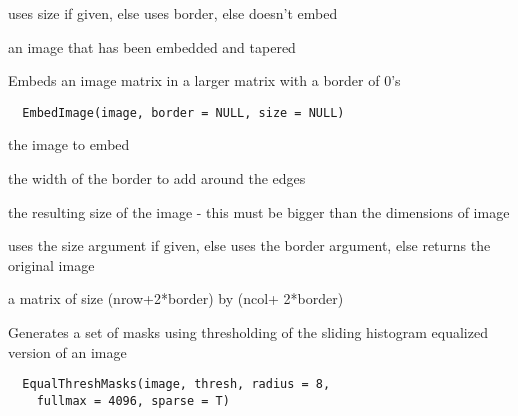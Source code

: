 \documentclass[a4paper]{book}
\begin{document}
%
\begin{Details}\relax
uses size if given, else uses border, else doesn't embed
\end{Details}
%
\begin{Value}
an image that has been embedded and tapered
\end{Value}
%
\begin{Description}\relax
Embeds an image matrix in a larger matrix with a border
of 0's
\end{Description}
%
\begin{Usage}
\begin{verbatim}
  EmbedImage(image, border = NULL, size = NULL)
\end{verbatim}
\end{Usage}
%
\begin{Arguments}
\begin{ldescription}
\item[\code{image}] the image to embed

\item[\code{border}] the width of the border to add around the
edges

\item[\code{size}] the resulting size of the image - this must
be bigger than the dimensions of image
\end{ldescription}
\end{Arguments}
%
\begin{Details}\relax
uses the size argument if given, else uses the border
argument, else returns the original image
\end{Details}
%
\begin{Value}
a matrix of size (nrow+2*border) by (ncol+ 2*border)
\end{Value}
%
\begin{Description}\relax
Generates a set of masks using thresholding of the
sliding histogram equalized version of an image
\end{Description}
%
\begin{Usage}
\begin{verbatim}
  EqualThreshMasks(image, thresh, radius = 8,
    fullmax = 4096, sparse = T)
\end{verbatim}
\end{Usage}
\end{document}
